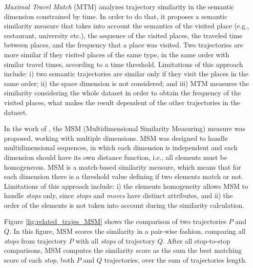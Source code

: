\documentclass[12pt]{article}
\begin{document}
\emph{Maximal Travel Match} (MTM)\cite{Xiao:2010:FSU:1869790.1869857} analyzes trajectory similarity in the semantic dimension constrained by time. In order to do that, it proposes a semantic similarity measure that takes into account the semantics of the visited place (e.g., restaurant, university etc.), the sequence of the visited places, the traveled time between places, and the frequency that a place was visited. Two trajectories are more similar if they visited places of the same type, in the same order with similar travel times, according to a time threshold. Limitations of this approach include: i) two semantic trajectories are similar only if they visit the places in the same order; ii) the space dimension is not considered; and iii) MTM measures the similarity considering the whole dataset in order to obtain the frequency of the visited places, what makes the result dependent of the other trajectories in the dataset.


In the work of \cite{Furtado:TGIS12156}, the MSM (Multidimensional Similarity Measuring) measure was proposed, working with multiple dimensions. MSM was designed to handle multidimensional sequences, in which each dimension is independent and each dimension should have its own distance function, i.e., all elements must be homogeneous. MSM is a match-based similarity measure, which means that for each dimension there is a threshold value defining if two elements match or not. Limitations of this approach include: i) the elements homogeneity allows MSM to handle \textit{stops} only, since \textit{stops} and \textit{moves} have distinct attributes, and ii) the order of the elements is not taken into account during the similarity calculation.

{Figure {\ref{fig:related_trajes_MSM}} shows the comparison of two trajectories $P$ and $Q$. In this figure, MSM scores the similarity in a pair-wise fashion, comparing all \emph{stops} from trajectory $P$ with all \emph{stops} of trajectory $Q$. After all stop-to-stop comparisons, MSM computes the similarity score as the sum the best matching score of each \emph{stop}, both $P$ and $Q$ trajectories, over the sum of trajectories length.}
\end{document}
